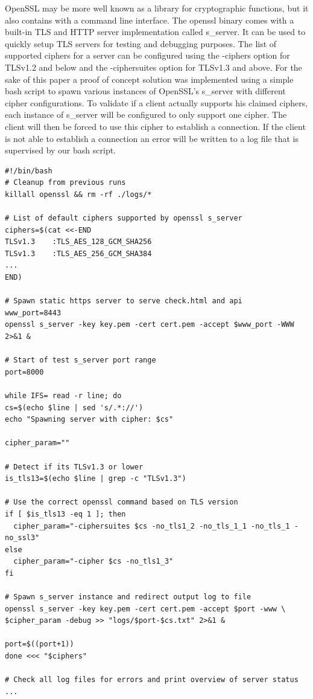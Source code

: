 \documentclass[12pt]{scrbook}
\begin{document}
OpenSSL may be more well known as a library for cryptographic functions, but it
also contains with a command line interface. The openssl binary comes with a
built-in TLS and HTTP server implementation called s\_server. It can be used to
quickly setup TLS servers for testing and debugging purposes. The list of
supported ciphers for a server can be configured using the -ciphers option for
TLSv1.2 and below and the -ciphersuites option for TLSv1.3 and above. For the
sake of this paper a proof of concept solution was implemented using a simple
bash script to spawn various instances of OpenSSL's s\_server with different
cipher configurations. To validate if a client actually supports his claimed
ciphers, each instance of s\_server will be configured to only support one
cipher. The client will then be forced to use this cipher to establish a
connection. If the client is not able to establish a connection an error will be
written to a log file that is supervised by our bash script.

\newpage

\begin{verbatim}
#!/bin/bash
# Cleanup from previous runs
killall openssl && rm -rf ./logs/*

# List of default ciphers supported by openssl s_server
ciphers=$(cat <<-END
TLSv1.3    :TLS_AES_128_GCM_SHA256
TLSv1.3    :TLS_AES_256_GCM_SHA384
...
END)

# Spawn static https server to serve check.html and api
www_port=8443
openssl s_server -key key.pem -cert cert.pem -accept $www_port -WWW 2>&1 &

# Start of test s_server port range
port=8000

while IFS= read -r line; do
cs=$(echo $line | sed 's/.*://')
echo "Spawning server with cipher: $cs"

cipher_param=""

# Detect if its TLSv1.3 or lower
is_tls13=$(echo $line | grep -c "TLSv1.3")

# Use the correct openssl command based on TLS version
if [ $is_tls13 -eq 1 ]; then
  cipher_param="-ciphersuites $cs -no_tls1_2 -no_tls_1_1 -no_tls_1 -no_ssl3"
else
  cipher_param="-cipher $cs -no_tls1_3"
fi

# Spawn s_server instance and redirect output log to file
openssl s_server -key key.pem -cert cert.pem -accept $port -www \
$cipher_param -debug >> "logs/$port-$cs.txt" 2>&1 &

port=$((port+1))
done <<< "$ciphers"

# Check all log files for errors and print overview of server status
...
\end{verbatim}
\end{document}
